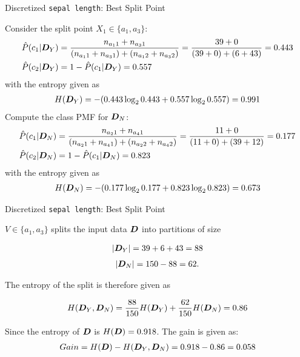 \begin{frame}{Discretized {\tt sepal length}: Best Split Point}

    Consider the split point $X_1 \in \{a_1,a_3\}$: 
    \begin{align*}
        \hat{P}(c_1|{\boldsymbol D}_Y) &=
        \frac{n_{a_1 1}+n_{a_3 1}}{
        (n_{a_1 1}+n_{a_3 1}) + (n_{a_1 2}+n_{a_3 2})}
        = {39+0 \over (39+0)+(6+43)} = 0.443\\
        \hat{P}(c_2|{\boldsymbol D}_Y) &= 1 - \hat{P}(c_1 | {\boldsymbol D}_Y) = 0.557
    \end{align*}
    with the entropy given as
    \begin{align*}
        H({\boldsymbol D}_Y) = -(0.443 \log_2 0.443 + 0.557 \log_2 0.557) =
        0.991
    \end{align*}
    Compute the class PMF for ${\boldsymbol D}_N$:
    \begin{align*}
        \hat{P}(c_1|{\boldsymbol D}_N) &
        = \frac{n_{a_2 1}+n_{a_4 1}}{
        (n_{a_2 1}+n_{a_4 1}) + (n_{a_2 2}+n_{a_4 2})}
        = {11+0 \over (11+0)+(39+12)} = 0.177\\
        \hat{P}(c_2|{\boldsymbol D}_N) &= 1 - \hat{P}(c_1|{\boldsymbol D}_N) = 0.823
    \end{align*}
    with the entropy given as
    \begin{align*}
        H({\boldsymbol D}_N) = -(0.177 \log_2 0.177 + 0.823 \log_2 0.823) =
        0.673
    \end{align*}
\end{frame}

\begin{frame}{Discretized {\tt sepal length}: Best Split Point}

    $V \in \{a_1,a_3\}$ splits the input data ${\boldsymbol D}$ into partitions of size

    \begin{align*}
    |{\boldsymbol D}_Y| = 39+6+43=88
    \end{align*}
    \begin{align*}
    |{\boldsymbol D}_N| = 150-88=62.
    \end{align*}

    The entropy of the split is therefore given as

    \begin{align*}
        H({\boldsymbol D}_Y, {\boldsymbol D}_N) = {88 \over 150} H({\boldsymbol D}_Y) + {62 \over
        150} H({\boldsymbol D}_N) = 0.86
    \end{align*}

    Since the entropy of ${\boldsymbol D}$ is $H({\boldsymbol D}) = 0.918$.
    The gain is given as:
    \begin{align*}
        Gain = H({\boldsymbol D}) - H({\boldsymbol D}_Y, {\boldsymbol D}_N) = 0.918 - 0.86 = 0.058
    \end{align*}

\end{frame}


